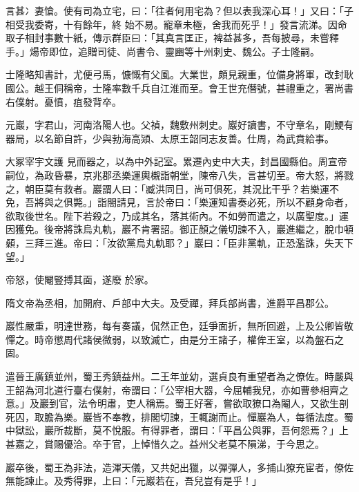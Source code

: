 \begin{pinyinscope}
 言甚⼎妻愴。使有司為立宅，曰：「往者何用宅為？但以表我深心耳！」又曰：「子相受我委寄，十有餘年，終
 始不易。寵章未極，舍我而死乎！」發言流涕。因命取子相封事數十紙，傳示群臣曰：「其真言匡正，裨益甚多，吾每披尋，未嘗釋手。」煬帝即位，追贈司徒、尚書令、靈豳等十州刺史、魏公。子士隆嗣。



 士隆略知書計，尤便弓馬，慷慨有父風。大業世，頗見親重，位備身將軍，改封耿國公。越王侗稱帝，士隆率數千兵自江淮而至。會王世充僭號，甚禮重之，署尚書右僕射。憂憤，疽發背卒。



 元巖，字君山，河南洛陽人也。父禎，魏敷州刺史。巖好讀書，不守章名，剛鯁有器局，以名節自許，少與勃海高熲、太原王韶同志友善。仕周，為武賁給事。



 大冢宰宇文護
 見而器之，以為中外記室。累遷內史中大夫，封昌國縣伯。周宣帝嗣位，為政昏暴，京兆郡丞樂運輿櫬詣朝堂，陳帝八失，言甚切至。帝大怒，將戮之，朝臣莫有救者。巖謂人曰：「臧洪同日，尚可俱死，其況比干乎？若樂運不免，吾將與之俱斃。」詣閤請見，言於帝曰：「樂運知書奏必死，所以不顧身命者，欲取後世名。陛下若殺之，乃成其名，落其術內。不如勞而遣之，以廣聖度。」運因獲免。後帝將誅烏丸軌，巖不肯署詔。御正顏之儀切諫不入，巖進繼之，脫巾頓顙，三拜三進。帝曰：「汝欲黨烏丸軌耶？」巖曰：「臣非黨軌，正恐濫誅，失天下望。」



 帝怒，使閹豎搏其面，遂廢
 於家。



 隋文帝為丞相，加開府、戶部中大夫。及受禪，拜兵部尚書，進爵平昌郡公。



 巖性嚴重，明達世務，每有奏議，侃然正色，廷爭面折，無所回避，上及公卿皆敬憚之。時帝懲周代諸侯微弱，以致滅亡，由是分王諸子，權侔王室，以為盤石之固。



 遣晉王廣鎮並州，蜀王秀鎮益州。二王年並幼，選貞良有重望者為之僚佐。時嚴與王韶為河北道行臺右僕射，帝謂曰：「公宰相大器，今屈輔我兒，亦如曹參相齊之意。」及巖到官，法令明肅，吏人稱焉。蜀王好奢，嘗欲取獠口為閹人，又欲生剖死囚，取膽為樂。巖皆不奉教，排閣切諫，王輒謝而止。憚巖為人，每循法度。蜀
 中獄訟，巖所裁斷，莫不悅服。有得罪者，謂曰：「平昌公與罪，吾何怨焉？」上甚嘉之，賞賜優洽。卒于官，上悼惜久之。益州父老莫不隕涕，于今思之。



 巖卒後，蜀王為非法，造渾天儀，又共妃出獵，以彈彈人，多捕山獠充宦者，僚佐無能諫止。及秀得罪，上曰：「元巖若在，吾兒豈有是乎！」




\end{pinyinscope}
